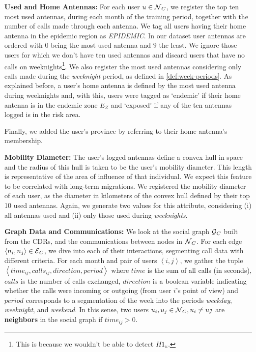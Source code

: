 \begin{enumerate*}[label={\alph*)},]
\item \textbf{Used and Home Antennas:} For each user $u \in \operatorname{\mathcal{N}}_C$, we register the top ten most used antennas, during each month of the training period,
together with the number of calls made through each antenna.
We tag all users having their home antenna in the epidemic region as \textit{EPIDEMIC}.
In our dataset user antennas are ordered with $0$ being the most used antenna and $9$ the least.
We ignore those users for which we don't have ten used antennas and discard users that have no calls on weeknights\footnote{This is because we wouldn't be able to detect $H1_u$.}.
We also register the most used antennas considering only calls made during the \textit{weeknight} period, as defined in \cref{def:week-periods}.
As explained before, a user's home antenna is defined by the most used antenna during weeknights and, with this, users were tagged as `endemic' if their home antenna is in the endemic zone $E_Z$ and `exposed' if any of the ten antennas logged is in the risk area.

Finally, we added the user's province by referring to their home antenna's membership.
\item \textbf{Mobility Diameter:} The user's logged antennas define a convex hull in space and the radius of this hull is taken to be the user's mobility diameter.
This length is representative of the area of influence of that individual.
We expect this feature to be correlated with long-term migrations.
We registered the mobility diameter of each user, as the diameter in kilometers of the convex hull defined by their top 10 used antennas.
Again, we generate two values for this attribute, considering (i) all antennas used and (ii) only those used during \textit{weeknights}.
\item \textbf{Graph Data and Communications:} We look at the social graph $\operatorname{\mathcal{G}}_C$ built from the CDRs, and the communications between nodes in $\operatorname{\mathcal{N}}_C$.
For each edge $\left< n_i, n_j \right> \in \operatorname{\mathcal{E}}_C$, we dive into each of their interactions, segmenting call data with different criteria.
For each month and pair of users $\left< i,j \right>$, we gather the tuple $\left< time_{ij}, calls_{ij}, direction, period \right>$ where $time$ is the sum of all calls (in seconds), $calls$ is the number of calls exchanged, $direction$ is a boolean variable indicating whether the calls were incoming or outgoing (from user $i$'s point of view) and $period$ corresponds to a segmentation of the week into the periods \textit{weekday}, \textit{weeknight}, and \textit{weekend}.
In this sense, two users $u_i, u_j \in \operatorname{\mathcal{N}}_C, u_i \neq uj$ are \textbf{neighbors} in the social graph if $time_{ij} > 0$.
\end{enumerate*}

